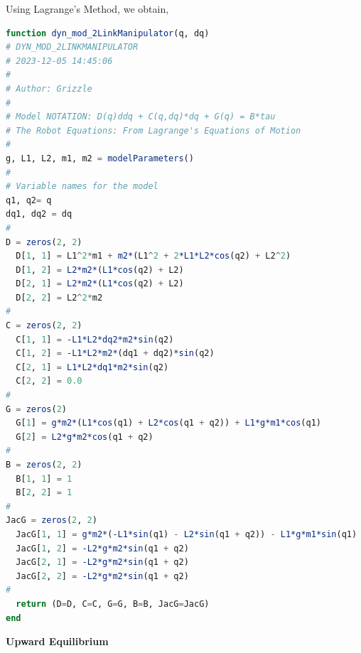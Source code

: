 \bigskip
Using Lagrange's Method, we obtain,
\begin{lstlisting}[language=Julia,style=mystyle]
function dyn_mod_2LinkManipulator(q, dq)
# DYN_MOD_2LINKMANIPULATOR
# 2023-12-05 14:45:06
#
# Author: Grizzle
#
# Model NOTATION: D(q)ddq + C(q,dq)*dq + G(q) = B*tau 
# The Robot Equations: From Lagrange's Equations of Motion
#
g, L1, L2, m1, m2 = modelParameters()
#
# Variable names for the model
q1, q2= q 
dq1, dq2 = dq
#
D = zeros(2, 2)
  D[1, 1] = L1^2*m1 + m2*(L1^2 + 2*L1*L2*cos(q2) + L2^2)
  D[1, 2] = L2*m2*(L1*cos(q2) + L2)
  D[2, 1] = L2*m2*(L1*cos(q2) + L2)
  D[2, 2] = L2^2*m2
#
C = zeros(2, 2)
  C[1, 1] = -L1*L2*dq2*m2*sin(q2)
  C[1, 2] = -L1*L2*m2*(dq1 + dq2)*sin(q2)
  C[2, 1] = L1*L2*dq1*m2*sin(q2)
  C[2, 2] = 0.0
#
G = zeros(2)
  G[1] = g*m2*(L1*cos(q1) + L2*cos(q1 + q2)) + L1*g*m1*cos(q1)
  G[2] = L2*g*m2*cos(q1 + q2)
#
B = zeros(2, 2)
  B[1, 1] = 1
  B[2, 2] = 1
#
JacG = zeros(2, 2)
  JacG[1, 1] = g*m2*(-L1*sin(q1) - L2*sin(q1 + q2)) - L1*g*m1*sin(q1)
  JacG[1, 2] = -L2*g*m2*sin(q1 + q2)
  JacG[2, 1] = -L2*g*m2*sin(q1 + q2)
  JacG[2, 2] = -L2*g*m2*sin(q1 + q2)
#
  return (D=D, C=C, G=G, B=B, JacG=JacG)
end
\end{lstlisting}


\bigskip
\textbf{Upward Equilibrium}

